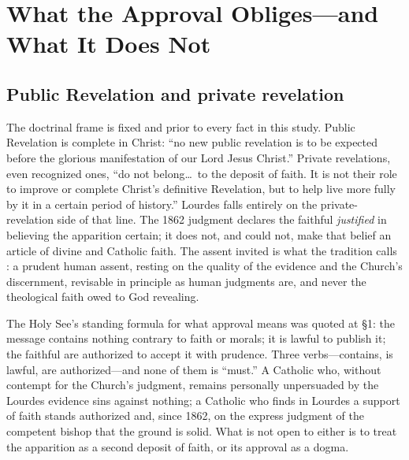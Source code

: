 \section{What the Approval Obliges---and What It Does Not}

\subsection{Public Revelation and private revelation}

The doctrinal frame is fixed and prior to every fact in this
study. Public Revelation is complete in Christ: ``no new public
revelation is to be expected before the glorious manifestation of
our Lord Jesus Christ.'' Private revelations, even recognized
ones, ``do not belong\ldots\ to the deposit of faith. It is not
their role to improve or complete Christ's definitive Revelation,
but to help live more fully by it in a certain period of
history.'' Lourdes falls entirely on
the private-revelation side of that line. The 1862 judgment
declares the faithful \emph{justified} in believing the
apparition certain; it does not, and could not, make that belief
an article of divine and Catholic faith. The assent invited is
what the tradition calls : a prudent human
assent, resting on the quality of the evidence and the Church's
discernment, revisable in principle as human judgments are, and
never the theological faith owed to God revealing.

The Holy See's standing formula for what approval means was
quoted at \S1: the message contains nothing contrary to faith or
morals; it is lawful to publish it; the faithful are authorized
to accept it with prudence. Three verbs---contains, is lawful,
are authorized---and none of them is ``must.'' A Catholic who,
without contempt for the Church's judgment, remains personally
unpersuaded by the Lourdes evidence sins against nothing; a
Catholic who finds in Lourdes a support of faith stands
authorized and, since 1862, on the express judgment of the
competent bishop that the ground is solid. What is not open to
either is to treat the apparition as a second deposit of faith,
or its approval as a dogma.

